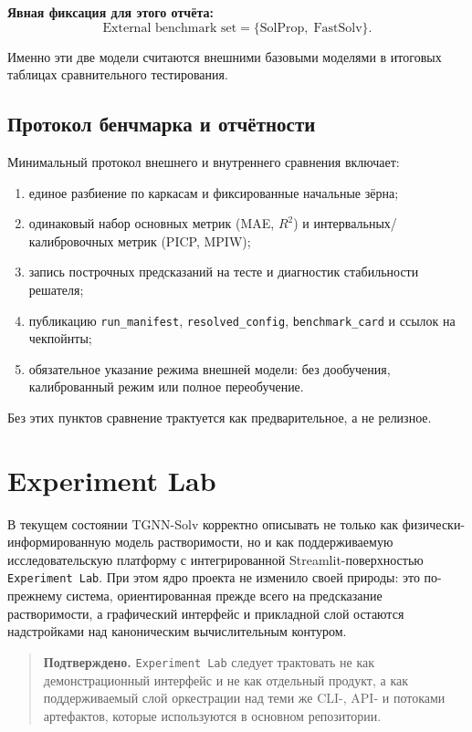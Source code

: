 \documentclass[11pt]{article}
\newcommand{\validated}[1]{\begin{quote}\textbf{Подтверждено.} #1\end{quote}}
\begin{document}
\textbf{Явная фиксация для этого отчёта:}
\begin{equation*}
\text{External benchmark set} = \{\text{SolProp},\;\text{FastSolv}\}.
\end{equation*}

Именно эти две модели считаются внешними базовыми моделями в итоговых таблицах сравнительного тестирования.

\subsection{Протокол бенчмарка и отчётности}

Минимальный протокол внешнего и внутреннего сравнения включает:
\begin{enumerate}
  \item единое разбиение по каркасам и фиксированные начальные зёрна;
  \item одинаковый набор основных метрик (MAE, $R^2$) и интервальных/калибровочных метрик (PICP, MPIW);
  \item запись построчных предсказаний на тесте и диагностик стабильности решателя;
  \item публикацию \texttt{run\_manifest}, \texttt{resolved\_config}, \texttt{benchmark\_card} и ссылок на чекпойнты;
  \item обязательное указание режима внешней модели: без дообучения, калиброванный режим или полное переобучение.
\end{enumerate}

Без этих пунктов сравнение трактуется как предварительное, а не релизное.

\section{Experiment Lab}

В текущем состоянии TGNN-Solv корректно описывать не только как физически-информированную модель растворимости, но и как поддерживаемую исследовательскую платформу с интегрированной Streamlit-поверхностью \texttt{Experiment Lab}. При этом ядро проекта не изменило своей природы: это по-прежнему система, ориентированная прежде всего на предсказание растворимости, а графический интерфейс и прикладной слой остаются надстройками над каноническим вычислительным контуром.

\validated{\texttt{Experiment Lab} следует трактовать не как демонстрационный интерфейс и не как отдельный продукт, а как поддерживаемый слой оркестрации над теми же CLI-, API- и потоками артефактов, которые используются в основном репозитории.}
\end{document}
